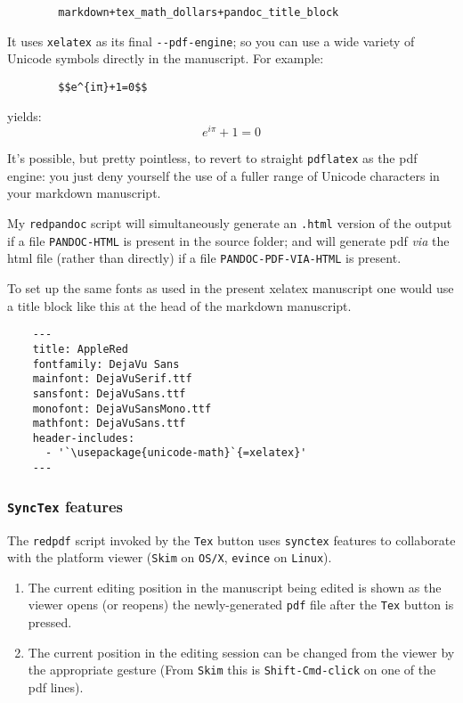 \documentclass[12pt,a4paper]{article}
\begin{document}
\begin{verbatim}
        markdown+tex_math_dollars+pandoc_title_block
\end{verbatim}

It uses \texttt{xelatex} as its final \texttt{-\/-pdf-engine}; so you can
use a wide variety of Unicode symbols directly in the manuscript. For
example:

\begin{verbatim}
        $$e^{iπ}+1=0$$
\end{verbatim}

yields: \[e^{iπ}+1=0\]

It's possible, but pretty pointless, to revert to straight
\texttt{pdflatex} as the pdf engine: you just deny yourself the use
of a fuller range of Unicode characters in your markdown manuscript.

My \texttt{redpandoc} script will simultaneously generate an
\texttt{.html} version of the output if a file \texttt{PANDOC-HTML} is
present in the source folder; and will generate pdf \emph{via} the html
file (rather than directly) if a file \texttt{PANDOC-PDF-VIA-HTML} is
present.

To set up the same fonts as used in the present xelatex manuscript
one would use a title block like this at the head of the markdown
manuscript.

\begin{verbatim}
    ---
    title: AppleRed
    fontfamily: DejaVu Sans
    mainfont: DejaVuSerif.ttf
    sansfont: DejaVuSans.ttf
    monofont: DejaVuSansMono.ttf 
    mathfont: DejaVuSans.ttf
    header-includes:
      - '`\usepackage{unicode-math}`{=xelatex}'
    ---
\end{verbatim}

\hypertarget{synctex-features}{%
\subsubsection{\texorpdfstring{\texttt{SyncTex}
features}{SyncTex features}}\label{synctex-features}}

The \texttt{redpdf} script invoked by the \texttt{Tex} button uses
\texttt{synctex} features to collaborate with the platform viewer
(\texttt{Skim} on \texttt{OS/X}, \texttt{evince} on \texttt{Linux}).

\begin{enumerate}
\def\labelenumi{\arabic{enumi}.}
\item
  The current editing position in the manuscript being edited is shown
  as the viewer opens (or reopens) the newly-generated \texttt{pdf} file
  after the \texttt{Tex} button is pressed.
\item
  The current position in the editing session can be changed from the
  viewer by the appropriate gesture (From \texttt{Skim} this is
  \texttt{Shift-Cmd-click} on one of the pdf lines).
\end{enumerate}
\end{document}
